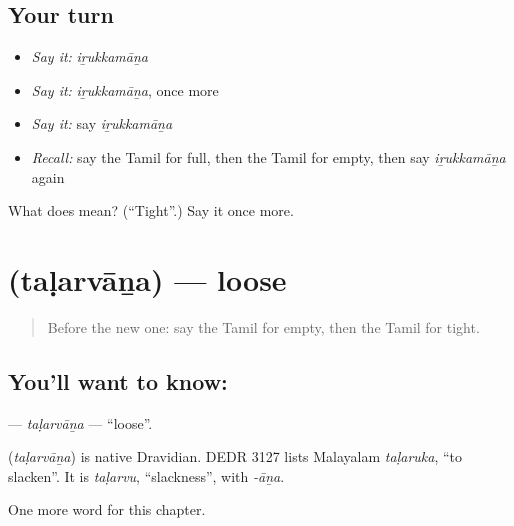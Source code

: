 \subsection*{Your turn}
\begin{itemize}
\raggedright
  \item \emph{Say it:} \emph{iṟukkamāṉa}
  \item \emph{Say it:} \emph{iṟukkamāṉa}, once more
  \item \emph{Say it:} say \emph{iṟukkamāṉa}
  \item \emph{Recall:} say the Tamil for full, then the Tamil for empty, then say \emph{iṟukkamāṉa} again
\end{itemize}

\begin{tcolorbox}[breakable,colback=teal!4,colframe=teal!35!black,title={Before you move on}]
What does  mean? (\textquotedblleft{}Tight\textquotedblright{}.) Say it once more.
\end{tcolorbox}
\section[\texorpdfstring{\ta{தளர்வான} (taḷarvāṉa)}{தளர்வான (taḷarvāṉa)}]{ (taḷarvāṉa) — loose}

\label{lesson:TA-C209-talarvana}



\begin{quote}
Before the new one: say the Tamil for empty, then the Tamil for tight.
\end{quote}

\subsection*{You'll want to know: }
\textbf{} — \emph{taḷarvāṉa} — \textquotedblleft{}loose\textquotedblright{}.

\begin{cousinweb}
\textbf{} (\emph{taḷarvāṉa}) is native Dravidian. DEDR 3127 lists Malayalam \emph{taḷaruka}, \textquotedblleft{}to slacken\textquotedblright{}. It is \emph{taḷarvu}, \textquotedblleft{}slackness\textquotedblright{}, with \emph{-āṉa}.
\end{cousinweb}

\begin{grammarlens}[title={What you've built}]
One more word for this chapter.
\end{grammarlens}

